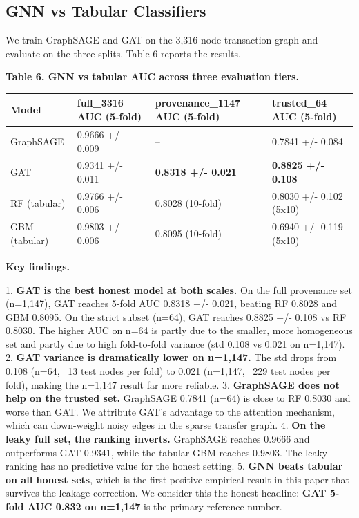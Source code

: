 \documentclass[sigconf,nonacm=false]{acmart}
\begin{document}
\subsection{GNN vs Tabular Classifiers}

We train GraphSAGE and GAT on the 3,316-node transaction graph and evaluate on the three splits. Table 6 reports the results.

\textbf{Table 6. GNN vs tabular AUC across three evaluation tiers.}

\begin{table}[h]
\centering
\small
\begin{tabular}{llll}
\toprule
Model & full\_3316 AUC (5-fold) & provenance\_1147 AUC (5-fold) & trusted\_64 AUC (5-fold) \\
\midrule
GraphSAGE & 0.9666 +/- 0.009 & -- & 0.7841 +/- 0.084 \\
GAT & 0.9341 +/- 0.011 & \textbf{0.8318 +/- 0.021} & \textbf{0.8825 +/- 0.108} \\
RF (tabular) & 0.9766 +/- 0.006 & 0.8028 (10-fold) & 0.8030 +/- 0.102 (5x10) \\
GBM (tabular) & 0.9803 +/- 0.006 & 0.8095 (10-fold) & 0.6940 +/- 0.119 (5x10) \\
\bottomrule
\end{tabular}
\end{table}

\textbf{Key findings.}

1. \textbf{GAT is the best honest model at both scales.} On the full provenance set (n=1,147), GAT reaches 5-fold AUC 0.8318 +/- 0.021, beating RF 0.8028 and GBM 0.8095. On the strict subset (n=64), GAT reaches 0.8825 +/- 0.108 vs RF 0.8030. The higher AUC on n=64 is partly due to the smaller, more homogeneous set and partly due to high fold-to-fold variance (std 0.108 vs 0.021 on n=1,147).
2. \textbf{GAT variance is dramatically lower on n=1,147.} The std drops from 0.108 (n=64, ~13 test nodes per fold) to 0.021 (n=1,147, ~229 test nodes per fold), making the n=1,147 result far more reliable.
3. \textbf{GraphSAGE does not help on the trusted set.} GraphSAGE 0.7841 (n=64) is close to RF 0.8030 and worse than GAT. We attribute GAT's advantage to the attention mechanism, which can down-weight noisy edges in the sparse transfer graph.
4. \textbf{On the leaky full set, the ranking inverts.} GraphSAGE reaches 0.9666 and outperforms GAT 0.9341, while the tabular GBM reaches 0.9803. The leaky ranking has no predictive value for the honest setting.
5. \textbf{GNN beats tabular on all honest sets}, which is the first positive empirical result in this paper that survives the leakage correction. We consider this the honest headline: \textbf{GAT 5-fold AUC 0.832 on n=1,147} is the primary reference number.
\end{document}

